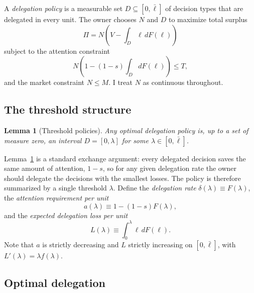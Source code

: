 \documentclass[11pt,a4paper]{article}
\theoremstyle{plain}
\newtheorem{lemma}{Lemma}
\newcommand{\lbar}{\bar{\ell}}
\begin{document}
A \emph{delegation policy} is a measurable set $D \subseteq [0, \lbar]$ of decision types that are delegated in every unit. The owner chooses $N$ and $D$ to maximize total surplus
\begin{equation}\label{eq:surplus}
  \Pi = N \left( V - \int_D \ell \, dF(\ell) \right)
\end{equation}
subject to the attention constraint
\begin{equation}\label{eq:attention}
  N \left( 1 - (1 - s) \int_D dF(\ell) \right) \le T,
\end{equation}
and the market constraint $N \le M$. I treat $N$ as continuous throughout.

\subsection{The threshold structure}

\begin{lemma}[Threshold policies]\label{lem:threshold}
Any optimal delegation policy is, up to a set of measure zero, an interval $D = [0, \lambda]$ for some $\lambda \in [0, \lbar]$.
\end{lemma}

Lemma~\ref{lem:threshold} is a standard exchange argument: every delegated decision saves the same amount of attention, $1 - s$, so for any given delegation rate the owner should delegate the decisions with the smallest losses. The policy is therefore summarized by a single threshold $\lambda$. Define the \emph{delegation rate} $\delta(\lambda) \equiv F(\lambda)$, the \emph{attention requirement per unit}
\begin{equation}\label{eq:a}
  a(\lambda) \equiv 1 - (1 - s) F(\lambda),
\end{equation}
and the \emph{expected delegation loss per unit}
\begin{equation}\label{eq:L}
  L(\lambda) \equiv \int_0^{\lambda} \ell \, dF(\ell).
\end{equation}
Note that $a$ is strictly decreasing and $L$ strictly increasing on $[0, \lbar]$, with $L'(\lambda) = \lambda f(\lambda)$.

\subsection{Optimal delegation}
\end{document}
